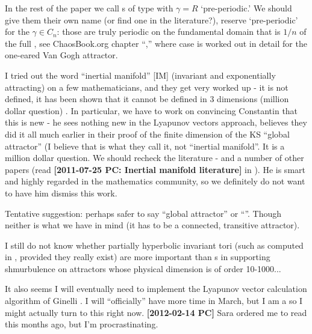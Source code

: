 \begin{description}
In the rest of the paper we call \po s of type  with
$\gamma=R$ `pre-periodic.' We should give them their own name (or find
one in the literature?), reserve `pre-periodic' for the $\gamma\in C_n$:
those are truly periodic on the fundamental domain that is $1/n$ of the
full \statesp, see ChaosBook.org chapter
``,''
where  case is worked out in detail for the one-eared Van Gogh
attractor.

\item[2011-12-06, 2012-02-14 PC]
I tried out the word ``inertial manifold'' [IM] (invariant and exponentially
attracting) on a few mathematicians, and they get very worked up - it is
not defined, it has been shown that it cannot be defined in 3 dimensions
(million dollar question) \etc. In particular, we have to work on
convincing Constantin that this is new - he sees nothing new in the
Lyapunov vectors approach, believes they did it all much earlier in their
proof of the finite dimension of the KS ``global attractor'' (I believe
that is what they call it, not ``inertial manifold''. It is a million
dollar question. We should recheck the literature -
 and a number of other
papers (read {\bf [2011-07-25 PC: Inertial manifold literature]} in
). He is smart and highly regarded in the
mathematics community, so we definitely do not want to have him dismiss
this work.

Tentative suggestion: perhaps safer to say ``global attractor'' or
``{\nws}''. Though neither is what we have in mind (it has to be a
connected, transitive attractor).

\item[2012-02-14 PC] I still do not know whether partially hyperbolic
invariant tori (such as computed in , provided they really exist)
are more important than \rpo s in supporting shmurbulence on attractors whose
physical dimension is of order 10-1000...

\item[2012-02-06 Evangelos]
It also seems I will eventually need to implement the Lyapunov vector
calculation algorithm of Ginelli \etal{}. I will
``officially'' have more time in March, but I am a
 so I might actually turn to this right now.
{\bf [2012-02-14 PC]} Sara ordered me to read this months ago, but
I'm procrastinating.


\end{description}
